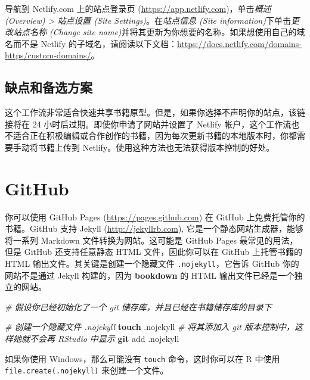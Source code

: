 \documentclass[
  12pt,
]{krantz}
\newenvironment{Shaded}{\begin{snugshade}}{\end{snugshade}}
\newcommand{\CommentTok}[1]{\textcolor[rgb]{0.56,0.35,0.01}{\textit{#1}}}
\newcommand{\FunctionTok}[1]{\textcolor[rgb]{0.13,0.29,0.53}{\textbf{#1}}}
\newcommand{\NormalTok}[1]{#1}
\theoremstyle{definition}
\theoremstyle{definition}
\theoremstyle{definition}
\theoremstyle{definition}
\theoremstyle{remark}
\begin{document}
导航到 Netlify.com 上的站点登录页 (\url{https://app.netlify.com})，单击\emph{概述 (Overview) \textgreater{} 站点设置 (Site Settings)}。在\emph{站点信息 (Site information)}下单击\emph{更改站点名称 (Change site name)}并将其更新为你想要的名称。如果想使用自己的域名而不是 Netlify 的子域名，请阅读以下文档：\url{https://docs.netlify.com/domains-https/custom-domains/}。

\hypertarget{ux7f3aux70b9ux548cux5907ux9009ux65b9ux6848}{%
\subsection{缺点和备选方案}\label{ux7f3aux70b9ux548cux5907ux9009ux65b9ux6848}}

这个工作流非常适合快速共享书籍原型。但是，如果你选择不声明你的站点，该链接将在 24 小时后过期。即使你申请了网站并设置了 Netlify 帐户，这个工作流也不适合正在积极编辑或合作创作的书籍，因为每次更新书籍的本地版本时，你都需要手动将书籍上传到 Netlify。使用这种方法也无法获得版本控制的好处。

\hypertarget{github}{%
\section{GitHub}\label{github}}

你可以使用 GitHub Pages (\url{https://pages.github.com}) 在 GitHub 上免费托管你的书籍。GitHub 支持 Jekyll (\url{http://jekyllrb.com}), 它是一个静态网站生成器，能够将一系列 Markdown 文件转换为网站。这可能是 GitHub Pages 最常见的用法，但是 GitHub 还支持任意静态 HTML 文件，因此你可以在 GitHub 上托管书籍的 HTML 输出文件。其关键是创建一个隐藏文件 \texttt{.nojekyll}，它告诉 GitHub 你的网站不是通过 Jekyll 构建的，因为 \textbf{bookdown} 的 HTML 输出文件已经是一个独立的网站。

\begin{Shaded}
\begin{Highlighting}[]
\CommentTok{\# 假设你已经初始化了一个 git 储存库，并且已经在书籍储存库的目录下}

\CommentTok{\# 创建一个隐藏文件 .nojekyll}
\FunctionTok{touch}\NormalTok{ .nojekyll}
\CommentTok{\# 将其添加入 git 版本控制中，这样她就不会再 RStudio 中显示}
\FunctionTok{git}\NormalTok{ add .nojekyll}
\end{Highlighting}
\end{Shaded}

如果你使用 Windows，那么可能没有 \texttt{touch} 命令，这时你可以在 R 中使用 \texttt{file.create(\textquotesingle{}.nojekyll\textquotesingle{})} 来创建一个文件。
\end{document}
